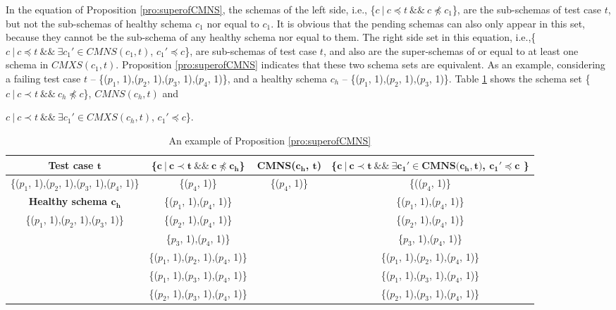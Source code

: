 In the equation of Proposition \ref{pro:superofCMNS}, the schemas of the left side, i.e., \{$c\ |\ c \preceq t\ \&\&\ c \npreceq c_{1}$\}, are the sub-schemas of test case $t$, but not the sub-schemas of healthy schema $c_{1}$ nor equal to $c_{1}$.  It is obvious that the pending schemas can also only appear in this set, because they cannot be the sub-schema of any healthy schema nor equal to them. The right side set in this equation, i.e.,\{$ c\ |\ c \preceq t \  \&\& \ \exists c_{1}' \in CMNS(c_{1}, t)$, $c_{1}' \preceq c$\}, are sub-schemas of test case $t$, and also are the super-schemas of or equal to at least one schema in $CMXS(c_{1}, t)$. Proposition \ref{pro:superofCMNS} indicates that these two schema sets are equivalent. As an example, considering a failing test case $t$ -- \{($p_{1}$, 1),($p_{2}$, 1),($p_{3}$, 1),($p_{4}$, 1)\}, and a healthy schema $c_{h}$ --  \{($p_{1}$, 1),($p_{2}$, 1),($p_{3}$, 1)\}. Table \ref{examleOfCMNSPro} shows the schema set  \{$c\ |\ c \prec t\ \&\&\ c_{h} \npreceq c$\}, $CMNS(c_{h}, t)$ and {$ c\ |\ c \prec t\ \&\& \ \exists c_{1}' \in CMXS(c_{h}, t)$, $c_{1}' \preceq c$\}.

\begin{table}[ht]
  \centering
  \setlength{\tabcolsep}{2pt}
  \caption{An example of Proposition \ref{pro:superofCMNS}}
  {\footnotesize
    \begin{tabular}{|c|c|c|c|}
    \hline
  \textbf{  Test case $\textbf{t}$} & \textbf{ \{$\textbf{c}\ |\ \textbf{c} \prec \textbf{t}\ \&\&\ \textbf{c} \npreceq \textbf{c}_{\textbf{h}}$\} }& \textbf{ CMNS($\textbf{c}_{\textbf{h}}$, $\textbf{t}$)} & \textbf{\{$ \textbf{c}\ |\ \textbf{c} \prec \textbf{t} \ \&\& \ \exists \textbf{c}_{\textbf{1}}' \in \textbf{CMNS}\textbf{(}\textbf{c}_{\textbf{h}}, \textbf{t}\textbf{)}$, $  \textbf{c}_{\textbf{1}}' \preceq \textbf{c}$ \}}\\\hline
    \{($p_{1}$, 1),($p_{2}$, 1),($p_{3}$, 1),($p_{4}$, 1)\}  & \{($p_{4}$, 1)\} & \{($p_{4}$, 1)\} & \{(($p_{4}$, 1)\}\\ \cline{1-1}
      \textbf{Healthy schema $\textbf{c}_{\textbf{h}}$}  & \{($p_{1}$, 1),($p_{4}$, 1)\} &  & \{($p_{1}$, 1),($p_{4}$, 1)\} \\\cline{1-1}
     \{($p_{1}$, 1),($p_{2}$, 1),($p_{3}$, 1)\}         &\{($p_{2}$, 1),($p_{4}$, 1)\}  &  & \{($p_{2}$, 1),($p_{4}$, 1)\}  \\
                         &\{$p_{3}$, 1),($p_{4}$, 1)\}   &  & \{$p_{3}$, 1),($p_{4}$, 1)\}  \\
                         &\{($p_{1}$, 1),($p_{2}$, 1),($p_{4}$, 1)\}   &  & \{($p_{1}$, 1),($p_{2}$, 1),($p_{4}$, 1)\}  \\
                         &\{($p_{1}$, 1),($p_{3}$, 1),($p_{4}$, 1)\}  &  & \{($p_{1}$, 1),($p_{3}$, 1),($p_{4}$, 1)\}  \\
                         &\{($p_{2}$, 1),($p_{3}$, 1),($p_{4}$, 1)\}  &  & \{($p_{2}$, 1),($p_{3}$, 1),($p_{4}$, 1)\}  \\ \hline
    \end{tabular}}%
  \label{examleOfCMNSPro}%
\end{table}%


}
